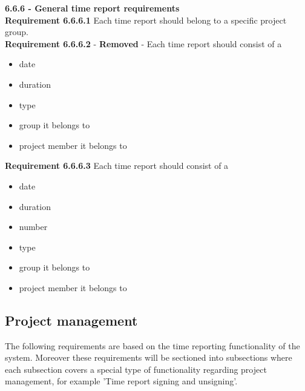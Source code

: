 \documentclass{article}
\begin{document}
{\fontsize{11}{11}\selectfont \noindent\textbf{6.6.6 - General time report requirements}} \\
\noindent
\textbf{Requirement 6.6.6.1} Each time report should belong to a specific project group. \\
\textbf{Requirement 6.6.6.2} - \textbf{Removed} - Each time report should consist of a
\begin{itemize}
\item date
\item duration
\item type
\item group it belongs to
\item project member  it belongs to
\end{itemize}
\textbf{Requirement 6.6.6.3} Each time report should consist of a
\begin{itemize}
\item date
\item duration
\item number
\item type
\item group it belongs to
\item project member  it belongs to
\end{itemize}





\setcounter{pmReq}{0}
\addtocounter{pmReq}{1}

\subsection{Project management}
The following requirements are based on the time reporting functionality of the system. Moreover these requirements will be sectioned into subsections where each subsection covers a special type of functionality regarding project management, for example 'Time report signing and unsigning'.\\
\end{document}
